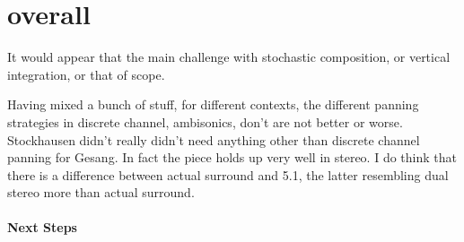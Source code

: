 \section{overall}
It would appear that the main challenge with stochastic composition,
or vertical integration, or that of scope. 

Having mixed a bunch of stuff, for different contexts, the different
panning strategies in discrete channel, ambisonics, don't are not
better or worse. Stockhausen didn't really didn't need anything other than
discrete channel panning for Gesang. In fact the piece holds up very
well in stereo. I do think that there is a difference between actual
surround and 5.1, the latter resembling dual stereo more than actual
surround. 

\paragraph{Next Steps}

